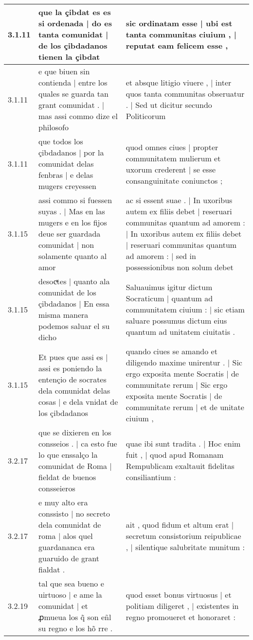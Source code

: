 \begin{tabular}{|p{1cm}|p{6.5cm}|p{6.5cm}|}
3.1.11 & que la çibdat es es si ordenada | do es tanta comunidat | de los çibdadanos tienen la çibdat & sic ordinatam esse | ubi est tanta communitas ciuium , | reputat eam felicem esse , \\\hline
3.1.11 & e que biuen sin contienda | entre los quales se guarda tan grant comunidat . | mas assi commo dize el philosofo & et absque litigio viuere , | inter quos tanta communitas obseruatur . | Sed ut dicitur secundo Politicorum \\\hline
3.1.11 & que todos los çibdadanos | por la comunidat delas fenbras | e delas mugers creyessen & quod omnes ciues | propter communitatem mulierum et uxorum crederent | se esse consanguinitate coniunctos ; \\\hline
3.1.15 & assi commo si fuessen suyas . | Mas en las mugers e en los fijos deue ser guardada comunidat | non solamente quanto al amor & ac si essent suae . | In uxoribus autem ex filiis debet | reseruari communitas quantum ad amorem : | In uxoribus autem ex filiis debet | reseruari communitas quantum ad amorem : | sed in possessionibus non solum debet \\\hline
3.1.15 & desocͣtes | quanto ala comunidat de los çibdadanos | En essa misma manera podemos saluar el su dicho & Saluauimus igitur dictum Socraticum | quantum ad communitatem ciuium : | sic etiam saluare possumus dictum eius quantum ad unitatem ciuitatis . \\\hline
3.1.15 & Et pues que assi es | assi es poniendo la entençio de socrates dela comunidat delas cosas | e dela vnidat de los çibdadanos & quando ciues se amando et diligendo maxime unirentur . | Sic ergo exposita mente Socratis | de communitate rerum | Sic ergo exposita mente Socratis | de communitate rerum | et de unitate ciuium , \\\hline
3.2.17 & que se dixieren en los consseios . | ca esto fue lo que enssalço la comunidat de Roma | fieldat de buenos consseieros & quae ibi sunt tradita . | Hoc enim fuit , | quod apud Romanam Rempublicam exaltauit fidelitas consiliantium : \\\hline
3.2.17 & e muy alto era conssisto | no secreto dela comunidat de roma | alos quel guardananca era guaruido de grant fialdat . & ait , quod fidum et altum erat | secretum consistorium reipublicae , | silentique salubritate munitum : \\\hline
3.2.19 & tal que sea bueno e uirtuoso | e ame la comunidat | et ꝓmueua los q̃ son eñl su regno e los hõ rre . & quod esset bonus virtuosus | et politiam diligeret , | existentes in regno promoueret et honoraret : \\\hline

\end{tabular}
